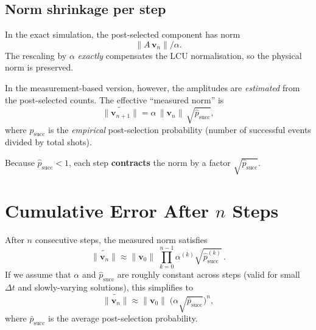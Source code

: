 \documentclass[11pt,a4paper]{article}
\begin{document}
\subsection{Norm shrinkage per step}

In the exact simulation, the post-selected component has norm
\begin{equation}
  \lVert A\,\mathbf v_n\rVert / \alpha.
\end{equation}
The rescaling by \(\alpha\) \emph{exactly} compensates the LCU
normalisation, so the physical norm is preserved.

In the measurement-based version, however, the amplitudes are
\emph{estimated} from the post-selected counts.  The effective
``measured norm'' is
\begin{equation}\label{eq:measured-norm}
  \widetilde{\lVert\mathbf v_{n+1}\rVert}
  = \alpha\,\lVert\mathbf v_n\rVert\,\sqrt{\hat p_{\text{succ}}},
\end{equation}
where \(\hat p_{\text{succ}}\) is the \emph{empirical} post-selection
probability (number of successful events divided by total shots).

Because \(\hat p_{\text{succ}} < 1\), each step \textbf{contracts} the
norm by a factor \(\sqrt{\hat p_{\text{succ}}}\).

\section{Cumulative Error After \texorpdfstring{$n$}{n} Steps}

After \(n\) consecutive steps, the measured norm satisfies
\begin{equation}\label{eq:cum}
  \widetilde{\lVert\mathbf v_n\rVert}
  \approx
  \lVert\mathbf v_0\rVert\;
  \prod_{k=0}^{n-1}\alpha^{(k)}\sqrt{\hat p_{\text{succ}}^{(k)}}\,.
\end{equation}
If we assume that \(\alpha\) and \(\hat p_{\text{succ}}\) are roughly
constant across steps (valid for small \(\Delta t\) and slowly-varying
solutions), this simplifies to
\begin{equation}\label{eq:exp-decay}
  \widetilde{\lVert\mathbf v_n\rVert}
  \approx
  \lVert\mathbf v_0\rVert\;\bigl(\alpha\sqrt{\bar p_{\text{succ}}}\bigr)^{n},
\end{equation}
where \(\bar p_{\text{succ}}\) is the average post-selection probability.
\end{document}

